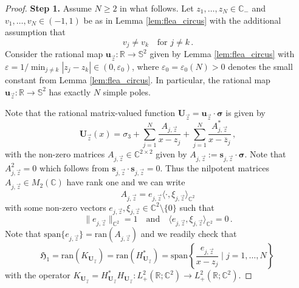\documentclass[11pt,reqno]{amsart}
\theoremstyle{definition}
\theoremstyle{remark}
\theoremstyle{remark}
\numberwithin{equation}{section}
\newcommand{\Hfr}{\mathfrak{H}}
\newcommand{\C}{\mathbb{C}}
\newcommand{\R}{\mathbb{R}}
\newcommand{\Ss}{\mathbb{S}}
\newcommand{\ov}{\overline}
\newcommand{\ran}{\mathrm{ran}}
\newcommand{\sv}{\mathbf{s}}
\newcommand{\eps}{\varepsilon}
\newcommand{\uu}{\mathbf{u}}
\newcommand{\Ub}{\mathbf{U}}
\begin{document}
\begin{appendix}
\begin{proof}
\textbf{Step 1.} Assume $N \geq 2$ in what follows. Let $z_1, \ldots, z_N \in \C_-$ and $v_1, \ldots, v_N \in (-1,1)$ be as in Lemma \ref{lem:flea_circus} with the additional assumption that
$$
v_j \neq v_k \quad \mbox{for $j \neq k$} \, .
$$
Consider the rational map $\uu_{\vec{z}} : \R \to \Ss^2$ given by Lemma \ref{lem:flea_circus} with $\eps = 1/\min_{j \neq k} |z_j-z_k| \in (0, \eps_0)$, where $\eps_0=\eps_0(N) > 0$ denotes the small constant from Lemma \ref{lem:flea_circus}. In particular, the rational map $\uu_{\vec{z}} : \R \to \Ss^2$ has exactly $N$ simple poles. 

Note that the rational matrix-valued function $\Ub_{\vec{z}} = \uu_{\vec{z}} \cdot \bm{\sigma}$ is given by
$$
\Ub_{\vec{z}}(x) = \sigma_3 + \sum_{j=1}^N \frac{A_{j,\vec{z}}}{x-z_j} + \sum_{j=1}^N \frac{A_{j,\vec{z}}^*}{x-\ov{z}_j} \, ,
$$ 
with the non-zero matrices $A_{j,\vec{z}} \in \C^{2 \times 2}$ given by $A_{j,\vec{z}} := \sv_{j,\vec{z}} \cdot \bm{\sigma}$. Note that $A_{j,\vec{z}}^2 = 0$ which follows from $\sv_{j,\vec{z}} \cdot \sv_{j,\vec{z}}=0$. Thus the nilpotent matrices $A_{j,\vec{z}} \in M_2(\C)$ have rank one and we can write
$$
A_{j, \vec{z}} = e_{j,\vec{z}} \langle \cdot, \xi_{j,\vec{z}} \rangle_{\C^2}
$$
with some non-zero vectors $e_{j,\vec{z}}, \xi_{j,\vec{z}} \in \C^2 \setminus \{ 0 \}$ such that 
$$
\|e_{j,\vec{z}} \|_{\C^2} = 1 \quad \mbox{and}  \quad \langle e_{j,\vec{z}}, \xi_{j, \vec{z}} \rangle_{\C^2} = 0 \, .
$$ 
Note that $\mathrm{span} \{ e_{j,\vec{z}} \} = \ran(A_{j, \vec{z}})$ and we readily check that
$$
\Hfr_1 = \ran(K_{\Ub_{\vec{z}}}) = \ran(H^*_{\Ub_{\vec{z}}}) = \mathrm{span} \left \{ \frac{e_{j,\vec{z}}}{x-z_j}  \mid j=1, \ldots, N \right \} \, 
$$
with the operator $K_{\Ub_{\vec{z}}} = H^*_{\Ub_{\vec{z}}} H_{\Ub_{\vec{z}}} : L^2_+(\R; \C^2) \to L^2_+(\R; \C^2)$.




\end{proof}
\end{appendix}
\end{document}
